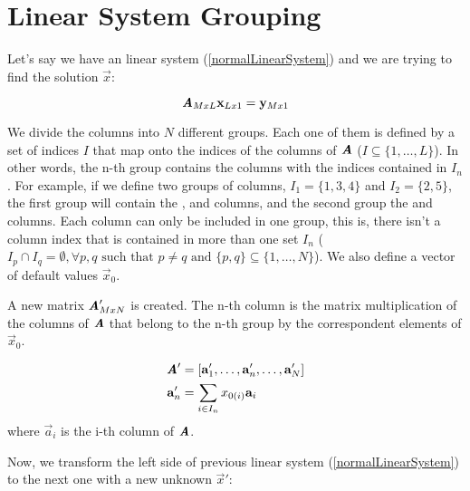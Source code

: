 \chapter{Linear System Grouping}

Let's say we have an linear system (\autoref{normalLinearSystem}) and we are trying to find the solution $\vec{x}$:

\begin{equation}
\bm{\mathit{A}}_{MxL} \mathbf{x}_{Lx1} = \mathbf{y}_{Mx1}
\label{normalLinearSystem}
\end{equation}

We divide the columns into $N$ different groups. Each one of them is defined by a set of indices $I$ that map onto the indices of the columns of $\bm{\mathit{A}}$ ($I \subseteq \{1, \ldots, L\}$). In other words, the n-th group contains the columns with the indices contained in $I_n$. For example, if we define two groups of columns, $I_1 = \{1, 3, 4\}$ and $I_2 = \{2, 5\}$, the first group will contain the ,  and  columns, and the second group the  and  columns. Each column can only be included in one group, this is, there isn't a column index that is contained in more than one set $I_n$ ($I_p \cap I_q = \emptyset, \forall p, q \text{ such that } p \neq q \text{ and } \{p, q\} \subseteq \{1, \ldots, N\}$). We also define a vector of default values $\vec{x}_0$.

A new matrix $\bm{\mathit{A}}'_{MxN}$ is created. The n-th column is the matrix multiplication of the columns of $\bm{\mathit{A}}$ that belong to the n-th group by the correspondent elements of $\vec{x}_0$.

\begin{equation}
\begin{aligned}
\bm{\mathit{A}}' &= [\mathbf{a}'_1,\ldots, \mathbf{a}'_n, \ldots, \mathbf{a}'_N] \\
\mathbf{a}'_n &=
\sum_{i \in I_n} x_{0(i)} \mathbf{a}_i
\end{aligned}
\end{equation}
where $\vec{a}_i$ is the i-th column of $\bm{\mathit{A}}$.

Now, we transform the left side of previous linear system (\autoref{normalLinearSystem}) to the next one with a new unknown $\vec{x}'$:

